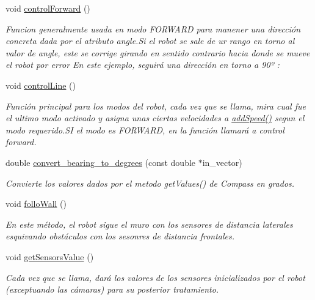 \begin{DoxyCompactItemize}
void \hyperlink{classRescue_a47bd9c67c0e779f2dbf9ce6e5f81b831_a47bd9c67c0e779f2dbf9ce6e5f81b831}{control\+Forward} ()
\begin{DoxyCompactList}\small\item\em Funcion generalmente usada en modo F\+O\+R\+W\+A\+RD para manener una dirección concreta dada por el atributo angle.\+Si el robot se sale de ur rango en torno al valor de angle, este se corrige girando en sentido contrario hacia donde se mueve el robot por error En este ejemplo, seguirá una dirección en torno a 90º \+: \end{DoxyCompactList}\item 
void \hyperlink{classRescue_aeef91de334e7779ce2fb2c2b57cd70c3_aeef91de334e7779ce2fb2c2b57cd70c3}{control\+Line} ()
\begin{DoxyCompactList}\small\item\em Función principal para los modos del robot, cada vez que se llama, mira cual fue el ultimo modo activado y asigna unas ciertas velocidades a \hyperlink{classRescue_a9a430924f65d71eca4e02dc9b2704947_a9a430924f65d71eca4e02dc9b2704947}{add\+Speed()} segun el modo requerido.\+SI el modo es F\+O\+R\+W\+A\+RD, en la función llamará a control forward. \end{DoxyCompactList}\item 
double \hyperlink{classRescue_ac0d22bd4b26374b9eba3a229397b08a2_ac0d22bd4b26374b9eba3a229397b08a2}{convert\+\_\+bearing\+\_\+to\+\_\+degrees} (const double $\ast$in\+\_\+vector)
\begin{DoxyCompactList}\small\item\em Convierte los valores dados por el metodo get\+Values() de Compass en grados. \end{DoxyCompactList}\item 
void \hyperlink{classRescue_aa9f20abea5898b53b03db91f2a323982_aa9f20abea5898b53b03db91f2a323982}{follo\+Wall} ()
\begin{DoxyCompactList}\small\item\em En este método, el robot sigue el muro con los sensores de distancia laterales esquivando obstáculos con los sesonres de distancia frontales. \end{DoxyCompactList}\item 
void \hyperlink{classRescue_a68675aa6bb37102baf46803451e16c82_a68675aa6bb37102baf46803451e16c82}{get\+Sensors\+Value} ()
\begin{DoxyCompactList}\small\item\em Cada vez que se llama, dará los valores de los sensores inicializados por el robot (exceptuando las cámaras) para su posterior tratamiento. \end{DoxyCompactList}\item 

\end{DoxyCompactItemize}

